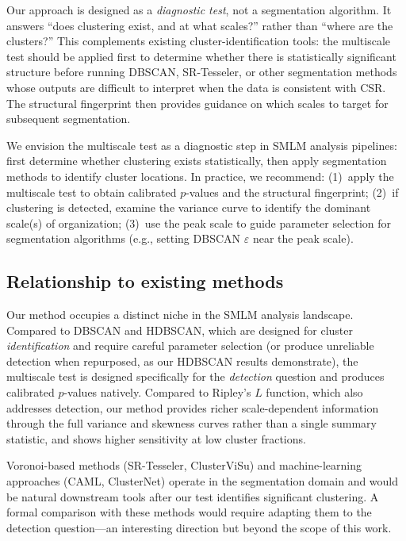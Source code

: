 \documentclass[11pt]{article}
\begin{document}
Our approach is designed as a \emph{diagnostic test}, not a segmentation
algorithm. It answers ``does clustering exist, and at what scales?''
rather than ``where are the clusters?'' This complements existing
cluster-identification tools: the multiscale test should be applied first
to determine whether there is statistically significant structure before
running DBSCAN, SR-Tesseler, or other segmentation methods whose outputs
are difficult to interpret when the data is consistent with CSR. The
structural fingerprint then provides guidance on which scales to target
for subsequent segmentation.

We envision the multiscale test as a diagnostic step in SMLM analysis
pipelines: first determine whether clustering exists statistically, then
apply segmentation methods to identify cluster locations. In practice,
we recommend: (1)~apply the multiscale test to obtain calibrated
$p$-values and the structural fingerprint; (2)~if clustering is
detected, examine the variance curve to identify the dominant scale(s)
of organization; (3)~use the peak scale to guide parameter selection for
segmentation algorithms (e.g., setting DBSCAN $\varepsilon$ near the
peak scale).

\subsection{Relationship to existing methods}

Our method occupies a distinct niche in the SMLM analysis landscape.
Compared to DBSCAN and HDBSCAN, which are designed for cluster
\emph{identification} and require careful parameter selection (or produce
unreliable detection when repurposed, as our HDBSCAN results
demonstrate), the multiscale test is designed specifically for the
\emph{detection} question and produces calibrated $p$-values natively.
Compared to Ripley's $L$ function, which also addresses detection, our
method provides richer scale-dependent information through the full
variance and skewness curves rather than a single summary statistic, and
shows higher sensitivity at low cluster fractions.

Voronoi-based methods (SR-Tesseler, ClusterViSu) and machine-learning
approaches (CAML, ClusterNet) operate in the segmentation domain and
would be natural downstream tools after our test identifies significant
clustering. A formal comparison with these methods would require
adapting them to the detection question---an interesting direction but
beyond the scope of this work.
\end{document}
